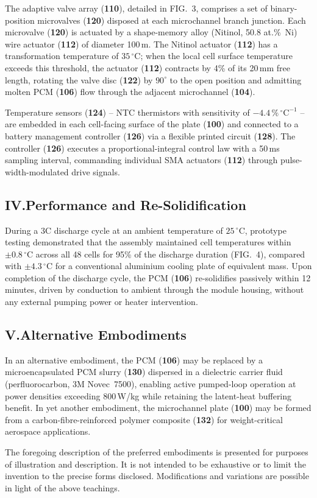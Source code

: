 The adaptive valve array (\textbf{110}), detailed in FIG.~3, comprises a set of
binary-position microvalves (\textbf{120}) disposed at each microchannel branch junction.
Each microvalve (\textbf{120}) is actuated by a shape-memory alloy (Nitinol, 50.8 at.\%~Ni)
wire actuator (\textbf{112}) of diameter 100\,\textmu m. The Nitinol actuator (\textbf{112})
has a transformation temperature of $35\,^{\circ}\mathrm{C}$; when the local cell surface temperature
exceeds this threshold, the actuator (\textbf{112}) contracts by 4\% of its 20\,mm free
length, rotating the valve disc (\textbf{122}) by $90^{\circ}$ to the open position and
admitting molten PCM (\textbf{106}) flow through the adjacent microchannel (\textbf{104}).

Temperature sensors (\textbf{124}) -- NTC thermistors with sensitivity of
$-4.4\,\%\,^{\circ}\mathrm{C}^{-1}$ -- are embedded in each cell-facing surface of the plate
(\textbf{100}) and connected to a battery management controller (\textbf{126}) via a
flexible printed circuit (\textbf{128}). The controller (\textbf{126}) executes a
proportional-integral control law with a 50\,ms sampling interval, commanding individual
SMA actuators (\textbf{112}) through pulse-width-modulated drive signals.

\subsection*{IV.\quad Performance and Re-Solidification}

During a 3C discharge cycle at an ambient temperature of $25\,^{\circ}$C, prototype testing
demonstrated that the assembly maintained cell temperatures within
$\pm 0.8\,^{\circ}$C across all 48 cells for 95\% of the discharge duration (FIG.~4),
compared with $\pm 4.3\,^{\circ}$C for a conventional aluminium cooling plate of equivalent
mass. Upon completion of the discharge cycle, the PCM (\textbf{106}) re-solidifies
passively within 12 minutes, driven by conduction to ambient through the module housing,
without any external pumping power or heater intervention.

\subsection*{V.\quad Alternative Embodiments}

In an alternative embodiment, the PCM (\textbf{106}) may be replaced by a microencapsulated
PCM slurry (\textbf{130}) dispersed in a dielectric carrier fluid (perfluorocarbon, 3M
Novec\texttrademark~7500), enabling active pumped-loop operation at power densities
exceeding 800\,W/kg while retaining the latent-heat buffering benefit. In yet another
embodiment, the microchannel plate (\textbf{100}) may be formed from a carbon-fibre-reinforced
polymer composite (\textbf{132}) for weight-critical aerospace applications.

The foregoing description of the preferred embodiments is presented for purposes of
illustration and description. It is not intended to be exhaustive or to limit the invention to
the precise forms disclosed. Modifications and variations are possible in light of the above
teachings.

